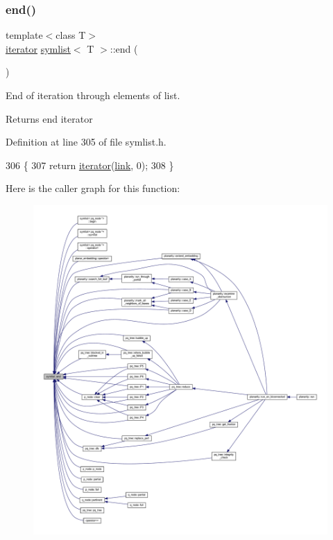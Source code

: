 \subsubsection{\texorpdfstring{end()}{end()}\hspace{0.1cm}{\footnotesize\ttfamily [1/2]}}
{\footnotesize\ttfamily template$<$class T$>$ \\
\mbox{\hyperlink{classsymlist_a66045fbe3d98975e5537092ede8b50df}{iterator}} \mbox{\hyperlink{classsymlist}{symlist}}$<$ T $>$\+::end (\begin{DoxyParamCaption}{ }\end{DoxyParamCaption})\hspace{0.3cm}{\ttfamily [inline]}}



End of iteration through elements of list. 

\begin{DoxyReturn}{Returns}
end iterator 
\end{DoxyReturn}


Definition at line 305 of file symlist.\+h.


\begin{DoxyCode}
306     \{
307     \textcolor{keywordflow}{return} \mbox{\hyperlink{classsymlist_a66045fbe3d98975e5537092ede8b50df}{iterator}}(\mbox{\hyperlink{classsymlist_a8fa81a7f6d0bb986bb593776db582c90}{link}}, 0);
308     \}
\end{DoxyCode}
Here is the caller graph for this function\+:\nopagebreak
\begin{figure}[H]
\begin{center}
\leavevmode
\includegraphics[width=350pt]{classsymlist_a7283589fa01f79d722f8256d7a6a7883_icgraph}
\end{center}
\end{figure}
\mbox{\label{classsymlist_a189c41a13b3dd377c113d802258ef418}} 
